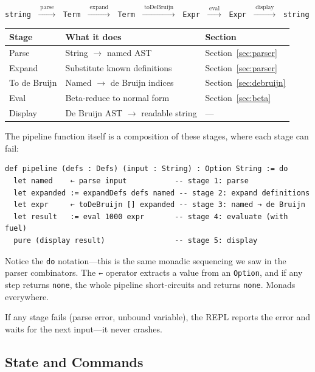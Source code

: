 \documentclass[11pt,a4paper]{article}
\theoremstyle{definition}
\begin{document}
\begin{center}
\texttt{string}
$\;\xrightarrow{\;\text{parse}\;}\;$
\texttt{Term}
$\;\xrightarrow{\;\text{expand}\;}\;$
\texttt{Term}
$\;\xrightarrow{\;\text{toDeBruijn}\;}\;$
\texttt{Expr}
$\;\xrightarrow{\;\text{eval}\;}\;$
\texttt{Expr}
$\;\xrightarrow{\;\text{display}\;}\;$
\texttt{string}
\end{center}

\begin{center}
\renewcommand{\arraystretch}{1.4}
\begin{tabular}{lll}
\textbf{Stage} & \textbf{What it does} & \textbf{Section} \\
\hline
Parse & String $\to$ named AST & Section~\ref{sec:parser} \\
Expand & Substitute known definitions & Section~\ref{sec:parser} \\
To de Bruijn & Named $\to$ de Bruijn indices & Section~\ref{sec:debruijn} \\
Eval & Beta-reduce to normal form & Section~\ref{sec:beta} \\
Display & De Bruijn AST $\to$ readable string & --- \\
\end{tabular}
\end{center}

The pipeline function itself is a composition of these stages, where each stage
can fail:

\begin{verbatim}
def pipeline (defs : Defs) (input : String) : Option String := do
  let named    ← parse input           -- stage 1: parse
  let expanded := expandDefs defs named -- stage 2: expand definitions
  let expr     ← toDeBruijn [] expanded -- stage 3: named → de Bruijn
  let result   := eval 1000 expr       -- stage 4: evaluate (with fuel)
  pure (display result)                -- stage 5: display
\end{verbatim}

Notice the \texttt{do} notation---this is the same monadic sequencing we saw
in the parser combinators. The \texttt{←} operator extracts a value from an
\texttt{Option}, and if any step returns \texttt{none}, the whole pipeline
short-circuits and returns \texttt{none}. Monads everywhere.

If any stage fails (parse error, unbound variable), the REPL reports the error
and waits for the next input---it never crashes.

\subsection{State and Commands}
\end{document}
